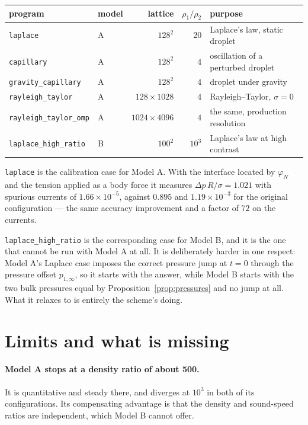 \documentclass[11pt,a4paper]{article}
\theoremstyle{plain}
\theoremstyle{definition}
\begin{document}
\begin{center}\small
\begin{tabular}{llrrl}
\toprule
program & model & lattice & $\rho_1/\rho_2$ & purpose \\
\midrule
\texttt{laplace}               & A & $128^2$          & $20$   & Laplace's law, static droplet \\
\texttt{capillary}             & A & $128^2$          & $4$    & oscillation of a perturbed droplet \\
\texttt{gravity\_capillary}    & A & $128^2$          & $4$    & droplet under gravity \\
\texttt{rayleigh\_taylor}      & A & $128\times1028$  & $4$    & Rayleigh--Taylor, $\sigma = 0$ \\
\texttt{rayleigh\_taylor\_omp} & A & $1024\times4096$ & $4$    & the same, production resolution \\
\texttt{laplace\_high\_ratio}  & B & $100^2$          & $10^3$ & Laplace's law at high contrast \\
\bottomrule
\end{tabular}
\end{center}

\texttt{laplace} is the calibration case for Model A. With the interface located
by $\varphi_N$ and the tension applied as a body force it measures
$\Delta p\,R/\sigma = 1.021$ with spurious currents of $1.66\times10^{-5}$,
against $0.895$ and $1.19\times10^{-3}$ for the original configuration --- the
same accuracy improvement and a factor of $72$ on the currents.

\texttt{laplace\_high\_ratio} is the corresponding case for Model B, and it is
the one that cannot be run with Model A at all. It is deliberately harder in one
respect: Model A's Laplace case imposes the correct pressure jump at $t = 0$
through the pressure offset $p_{1,\infty}$, so it starts with the answer, while
Model B starts with the two bulk pressures equal by
Proposition~\ref{prop:pressures} and no jump at all. What it relaxes to is
entirely the scheme's doing.

\section{Limits and what is missing}
\label{sec:limits}

\paragraph{Model A stops at a density ratio of about 500.} It is quantitative
and steady there, and diverges at $10^3$ in both of its configurations. Its
compensating advantage is that the density and sound-speed ratios are
independent, which Model B cannot offer.
\end{document}
